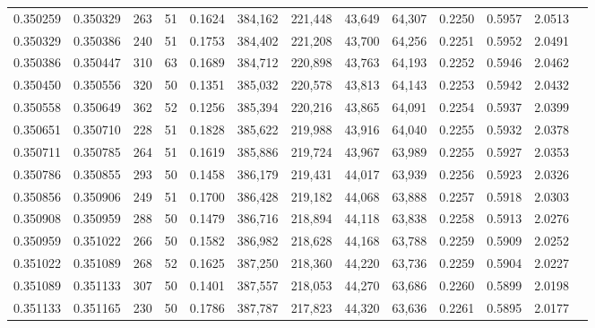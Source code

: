 \begin{tabular}{rrrrrrrrrrrrr}
0.350259 & 0.350329 &   263 &  51 &                                     0.1624 & 384,162 & 221,448 &  43,649 &  64,307 & 0.2250 & 0.5957 & 2.0513 \\
0.350329 & 0.350386 &   240 &  51 &                                     0.1753 & 384,402 & 221,208 &  43,700 &  64,256 & 0.2251 & 0.5952 & 2.0491 \\
0.350386 & 0.350447 &   310 &  63 &                                     0.1689 & 384,712 & 220,898 &  43,763 &  64,193 & 0.2252 & 0.5946 & 2.0462 \\
0.350450 & 0.350556 &   320 &  50 &                                     0.1351 & 385,032 & 220,578 &  43,813 &  64,143 & 0.2253 & 0.5942 & 2.0432 \\
0.350558 & 0.350649 &   362 &  52 &                                     0.1256 & 385,394 & 220,216 &  43,865 &  64,091 & 0.2254 & 0.5937 & 2.0399 \\
0.350651 & 0.350710 &   228 &  51 &                                     0.1828 & 385,622 & 219,988 &  43,916 &  64,040 & 0.2255 & 0.5932 & 2.0378 \\
0.350711 & 0.350785 &   264 &  51 &                                     0.1619 & 385,886 & 219,724 &  43,967 &  63,989 & 0.2255 & 0.5927 & 2.0353 \\
0.350786 & 0.350855 &   293 &  50 &                                     0.1458 & 386,179 & 219,431 &  44,017 &  63,939 & 0.2256 & 0.5923 & 2.0326 \\
0.350856 & 0.350906 &   249 &  51 &                                     0.1700 & 386,428 & 219,182 &  44,068 &  63,888 & 0.2257 & 0.5918 & 2.0303 \\
0.350908 & 0.350959 &   288 &  50 &                                     0.1479 & 386,716 & 218,894 &  44,118 &  63,838 & 0.2258 & 0.5913 & 2.0276 \\
0.350959 & 0.351022 &   266 &  50 &                                     0.1582 & 386,982 & 218,628 &  44,168 &  63,788 & 0.2259 & 0.5909 & 2.0252 \\
0.351022 & 0.351089 &   268 &  52 &                                     0.1625 & 387,250 & 218,360 &  44,220 &  63,736 & 0.2259 & 0.5904 & 2.0227 \\
0.351089 & 0.351133 &   307 &  50 &                                     0.1401 & 387,557 & 218,053 &  44,270 &  63,686 & 0.2260 & 0.5899 & 2.0198 \\
0.351133 & 0.351165 &   230 &  50 &                                     0.1786 & 387,787 & 217,823 &  44,320 &  63,636 & 0.2261 & 0.5895 & 2.0177 \\

\end{tabular}
